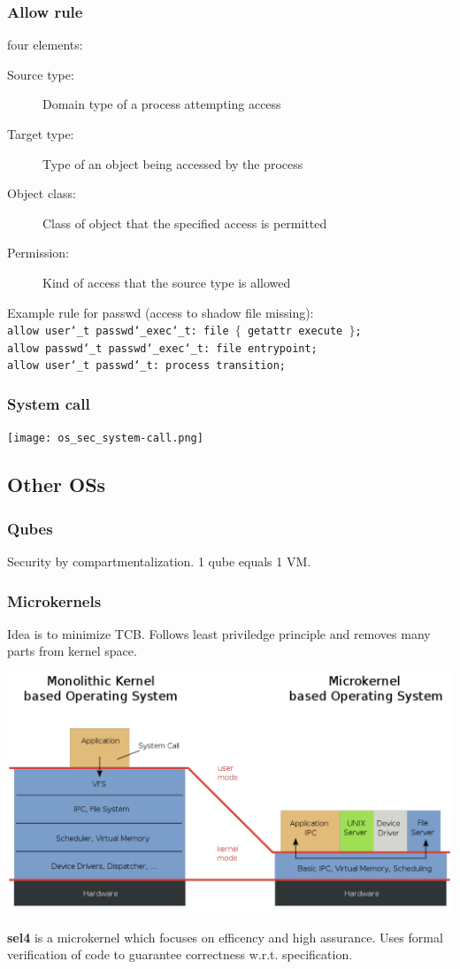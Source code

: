 \subsubsection{Allow rule}
four elements:
\begin{description}
  \item[Source type:] Domain type of a process attempting access
  \item[Target type:] Type of an object being accessed by the process
  \item[Object class:] Class of object that the specified access is permitted
  \item[Permission:] Kind of access that the source type is allowed
\end{description}

Example rule for passwd (access to shadow file missing):\\
\texttt{allow user\char`_t passwd\char`_exec\char`_t: file $\{$ getattr execute $\}$; \\ allow passwd\char`_t passwd\char`_exec\char`_t: file entrypoint; \\ allow user\char`_t passwd\char`_t: process transition;}

\subsubsection{System call}
\begin{center}
  \texttt{[image: os\_sec\_system-call.png]}
\end{center}

\subsection{Other OSs}
\subsubsection{Qubes}
Security by compartmentalization. 1 qube equals 1 VM.

\subsubsection{Microkernels}
Idea is to minimize TCB. Follows least priviledge principle and removes many parts from kernel space.
\begin{center}
    \includegraphics[width=0.8\linewidth]{images/os_sec_MicrokernelVSMonolithic.png}
\end{center}

\textbf{sel4} is a microkernel which focuses on efficency and high assurance. Uses formal verification of code to guarantee correctness w.r.t. specification.
